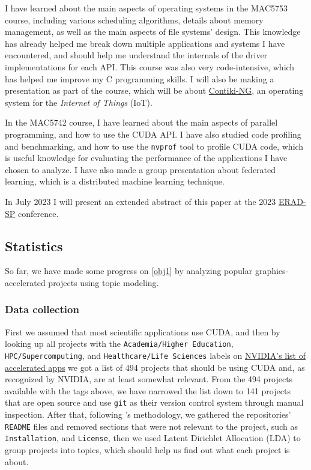 \documentclass[conference, onecolumn]{IEEEtran}
\begin{document}
I have learned about the main aspects of operating systems in the MAC5753
course, including various scheduling algorithms, details about memory
management, as well as the main aspects of file systems' design.
This knowledge has already helped me break down multiple applications and
systems I have encountered, and should help me understand the internals of the
driver implementations for each API.
This course was also very code-intensive, which has helped me improve my
C programming skills.
I will also be making a presentation as part of the course, which will be about
\href{https://github.com/contiki-ng/contiki-ng}{Contiki-NG}, an operating
system for the \textit{Internet of Things} (IoT).

In the MAC5742 course, I have learned about the main aspects of parallel
programming, and how to use the CUDA API.
I have also studied code profiling and benchmarking, and how to use the
\verb|nvprof| tool to profile CUDA code, which is useful knowledge for
evaluating the performance of the applications I have chosen to analyze.
I have also made a group presentation about federated learning, which is a
distributed machine learning technique.

In July 2023 I will present an extended abstract of this paper at the 2023
\href{https://sites.google.com/view/erad-sp2023/home}{ERAD-SP} conference.

\subsection{Statistics} \label{sec:methodology:statistics}

So far, we have made some progress on \cref{obj1} by analyzing popular
graphics-accelerated projects using topic modeling.

\subsubsection{Data collection} \label{sec:methodology:statistics-data}

First we assumed that most scientific applications use CUDA, and then by
looking up all projects with the \verb|Academia/Higher Education|,
\verb|HPC/Supercomputing|, and \verb|Healthcare/Life Sciences| labels on
\href{https://nvidia.com/en-us/gpu-accelerated-applications}{NVIDIA's list of accelerated apps}
we got a list of 494 projects that should be using CUDA and, as recognized by
NVIDIA, are at least somewhat relevant.
From the 494 projects available with the tags above, we have narrowed the list
down to 141 projects that are open source and use \verb|git| as their version
control system through manual inspection.
After that, following \cite{zheng2018measuring}'s methodology, we gathered the
repositories' \verb|README| files and removed sections that were not relevant to
the project, such as \verb|Installation|, and \verb|License|, then we used
Latent Dirichlet Allocation (LDA) to group projects into topics, which should
help us find out what each project is about.
\end{document}
